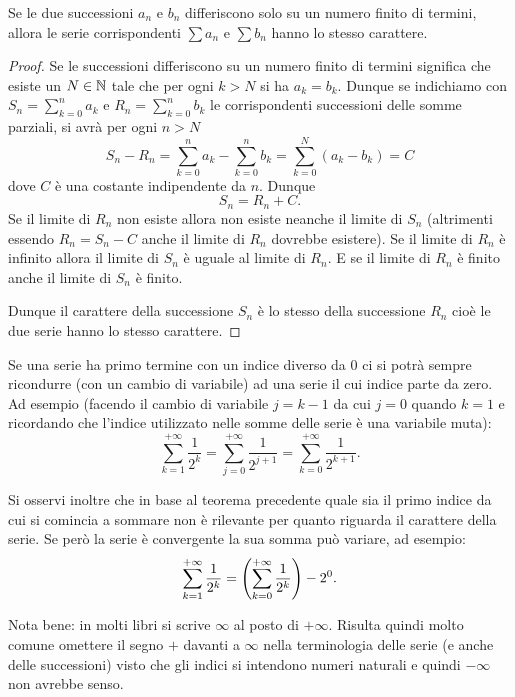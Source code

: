\begin{theorem}%
%
%
%
%
Se le due successioni $a_n$ e $b_n$ differiscono solo su un numero finito
%
di termini, allora le serie corrispondenti $\sum a_n$ e $\sum b_n$ hanno lo stesso carattere.
\end{theorem}
%
\begin{proof}
Se le successioni differiscono su un numero finito di termini significa
che esiste un $N\in {\mathbb N}$ tale che per ogni $k>N$ si ha $a_k=b_k$.
Dunque se indichiamo con $S_n = \sum_{k=0}^n a_k$ e $R_n = \sum_{k=0}^n b_k$
le corrispondenti successioni delle somme parziali, si avrà per ogni $n>N$
\[
  S_n - R_n
    = \sum_{k=0}^n a_k - \sum_{k=0}^n b_k
    = \sum_{k=0}^N (a_k - b_k) = C
\]
dove $C$ è una costante indipendente da $n$. Dunque
\[
  S_n = R_n + C.
\]
Se il limite di $R_n$ non esiste allora non esiste neanche il limite
di $S_n$ (altrimenti essendo $R_n = S_n -C$ anche il limite di $R_n$ dovrebbe esistere). Se il limite di $R_n$ è infinito allora il limite di $S_n$ è uguale
al limite di $R_n$. E se il limite di $R_n$ è finito anche il limite di $S_n$ è finito.

Dunque il carattere della successione $S_n$ è lo stesso della successione $R_n$
cioè le due serie hanno lo stesso carattere.
\end{proof}

Se una serie ha
primo termine con un indice diverso da $0$
ci si potrà sempre ricondurre (con un cambio di variabile)
ad una serie il cui indice parte da zero. Ad esempio
(facendo il cambio di variabile $j=k-1$ da cui $j=0$ quando $k=1$
e ricordando che l'indice utilizzato nelle somme delle
serie è una variabile muta):
\[
 \sum_{k=1}^{+\infty} \frac{1}{2^k}
 = \sum_{j=0}^{+\infty} \frac{1}{2^{j+1}}
 = \sum_{k=0}^{+\infty} \frac{1}{2^{k+1}}.
\]

Si osservi inoltre che in base al teorema precedente quale sia il primo indice
da cui si comincia a sommare non è rilevante per quanto riguarda il carattere della serie.
Se però la serie è convergente la sua somma può variare, ad esempio:
\[
 \sum_{k=1}^{+\infty} \frac{1}{2^k}
 = {\left( \sum_{k=0}^{+\infty} \frac{1}{2^k} \right)} - 2^0.
\]

Nota bene: in molti libri si scrive $\infty$ al posto di $+\infty$.
Risulta quindi molto comune omettere il segno $+$ davanti a $\infty$
nella terminologia delle serie (e anche delle successioni) visto
che gli indici si intendono numeri naturali e quindi $-\infty$ non avrebbe
senso.

